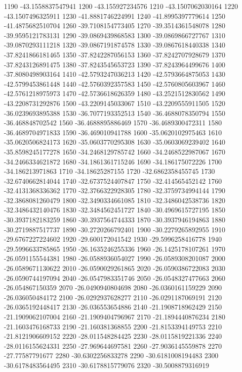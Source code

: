 {1190 -43.1558837547941
1200 -43.155927234576
1210 -43.1507062030164
1220 -43.1507496325911
1230 -41.8881746224991
1240 -41.8995397779614
1250 -41.4875682510704
1260 -39.7108154773405
1270 -39.3514361548078
1280 -39.9595121783131
1290 -39.0869439868583
1300 -39.0869866727767
1310 -39.0870293111218
1320 -39.0867191874578
1330 -39.0867618440338
1340 -37.8241866181465
1350 -37.8242287056153
1360 -37.8242707928679
1370 -37.8243126891475
1380 -37.8243545653723
1390 -37.8243964499676
1400 -37.8080498903164
1410 -42.5793247036213
1420 -42.5793664875053
1430 -42.5799453861448
1440 -42.5760392357583
1450 -42.5760805603967
1460 -42.5761218975973
1470 -42.5736618626359
1480 -43.2521512830562
1490 -43.2208731292876
1500 -43.2209145033067
1510 -43.2209555911505
1520 -36.0239693895388
1530 -36.7077193352513
1540 -36.4688078350794
1550 -36.468848702542
1560 -36.4688895886469
1570 -36.4689300472311
1580 -36.4689704971833
1590 -36.469010941788
1600 -35.0620102975463
1610 -35.0620506824173
1620 -35.0603770295308
1630 -35.0603069239402
1640 -35.8598245177278
1650 -34.2468129785742
1660 -34.2468522987067
1670 -34.2466334621872
1680 -34.1861361715246
1690 -34.186175072226
1700 -34.186213971863
1710 -34.18625287155
1720 -32.6862358455745
1730 -32.6740662814044
1740 -32.6737524407847
1750 -32.414565452142
1760 -32.4131368336362
1770 -32.3766322928305
1780 -32.3759734994144
1790 -32.3868081260479
1800 -32.3490334661085
1810 -32.3486042538736
1820 -32.3486432140476
1830 -32.3484562451727
1840 -30.4969615727195
1850 -30.3937182183259
1860 -30.3937564744333
1870 -30.3937946194863
1880 -30.2719887517737
1890 -30.2720266792401
1900 -30.2279265892955
1910 -29.6767227224602
1920 -29.600172041542
1930 -29.5996258416778
1940 -29.5996633785865
1950 -26.1635246255336
1960 -26.1425178107261
1970 -26.0591155544381
1980 -26.0588936054027
1990 -26.0589308201087
2000 -26.0589671130622
2010 -26.0590029261865
2020 -26.0590386722083
2030 -26.0590744197094
2040 -26.0547983351746
2050 -26.0548327477663
2060 -26.054867150359
2070 -26.0490940804698
2080 -26.0360161159229
2090 -26.036050484172
2100 -26.0292937628277
2110 -26.0291187069191
2120 -26.0365192448417
2130 -26.036553654886
2140 -21.1908718962429
2150 -21.1909062107004
2160 -21.1909404796967
2170 -21.1894440876234
2180 -21.1603476168733
2190 -21.160381368855
2200 -21.8153394149753
2210 -21.8121906609152
2220 -28.011548284425
2230 -28.0115819221336
2240 -28.0116155624331
2250 -27.969644697581
2260 -27.9036145559878
2270 -27.77587791677
2280 -30.6302256833278
2290 -30.6181008194483
2300 -30.6178483564495
2310 -30.6178815779076
2320 -30.5008879316919
}
